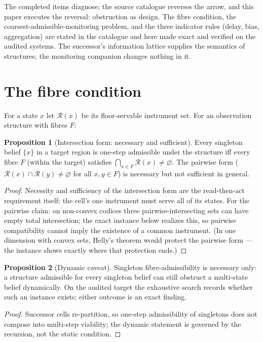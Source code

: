 \documentclass[10pt,twocolumn]{article}
\theoremstyle{definition}
\newtheorem{proposition}{Proposition}
\begin{document}
The completed items diagnose; the source catalogue reverses the arrow, and
this paper executes the reversal: obstruction as design. The fibre
condition, the coarsest-admissible-monitoring problem, and the three
indicator rules (delay, bias, aggregation) are stated in the catalogue and
here made exact and verified on the audited systems. The successor's
information lattice supplies the semantics of structures; the monitoring
companion changes nothing in it.

\section{The fibre condition}

For a state $x$ let $\mathcal R(x)$ be its floor-servable instrument set.
For an observation structure with fibres $F$:

\begin{proposition}[Intersection form: necessary and sufficient]
\label{prop:fibre}
Every singleton belief $\{x\}$ in a target region is one-step admissible
under the structure iff every fibre $F$ (within the target) satisfies
$\bigcap_{x\in F}\mathcal R(x)\neq\varnothing$. The pairwise form
($\mathcal R(x)\cap\mathcal R(y)\neq\varnothing$ for all $x,y\in F$) is
necessary but not sufficient in general.
\end{proposition}
\begin{proof}
Necessity and sufficiency of the intersection form are the read-then-act
requirement itself: the cell's one instrument must serve all of its states.
For the pairwise claim: on non-convex codices three pairwise-intersecting
sets can have empty total intersection; the exact instance below realizes
this, so pairwise compatibility cannot imply the existence of a common
instrument. (In one dimension with convex sets, Helly's theorem would
protect the pairwise form --- the instance shows exactly where that
protection ends.)
\end{proof}

\begin{proposition}[Dynamic caveat]
Singleton fibre-admissibility is necessary only: a structure admissible for
every singleton belief can still obstruct a multi-state belief
dynamically. On the audited target the exhaustive search records whether
such an instance exists; either outcome is an exact finding.
\end{proposition}
\begin{proof}
Successor cells re-partition, so one-step admissibility of singletons does
not compose into multi-step viability; the dynamic statement is governed by
the recursion, not the static condition.
\end{proof}
\end{document}
